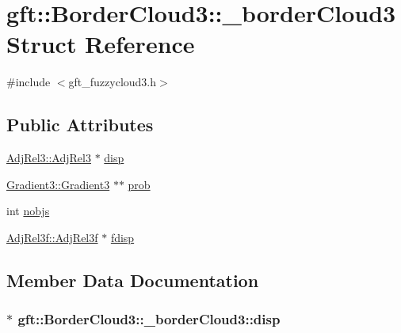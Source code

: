 \hypertarget{structgft_1_1BorderCloud3_1_1__borderCloud3}{}\section{gft\+:\+:Border\+Cloud3\+:\+:\+\_\+border\+Cloud3 Struct Reference}
\label{structgft_1_1BorderCloud3_1_1__borderCloud3}


{\ttfamily \#include $<$gft\+\_\+fuzzycloud3.\+h$>$}

\subsection*{Public Attributes}
\begin{DoxyCompactItemize}
\item 
\hyperlink{namespacegft_1_1AdjRel3_a0d54e2f148bf5636f3a3faf70d4eb5ae}{Adj\+Rel3\+::\+Adj\+Rel3} $\ast$ \hyperlink{structgft_1_1BorderCloud3_1_1__borderCloud3_a0fec3cf9d771fd02fcbb1687a51cc937}{disp}
\item 
\hyperlink{namespacegft_1_1Gradient3_acc3ba84d5f1e1fd680f64f29da6ac0eb}{Gradient3\+::\+Gradient3} $\ast$$\ast$ \hyperlink{structgft_1_1BorderCloud3_1_1__borderCloud3_a3828cfea35d3619a113a52594662993d}{prob}
\item 
int \hyperlink{structgft_1_1BorderCloud3_1_1__borderCloud3_a9837901f9e28f40dd2918d9687e53582}{nobjs}
\item 
\hyperlink{namespacegft_1_1AdjRel3f_a83ef20d6a560143af34ad546deafbe5f}{Adj\+Rel3f\+::\+Adj\+Rel3f} $\ast$ \hyperlink{structgft_1_1BorderCloud3_1_1__borderCloud3_aa24ef7cdb7021c700f0148d2d137a753}{fdisp}
\end{DoxyCompactItemize}


\subsection{Member Data Documentation}
\subsubsection[{\texorpdfstring{disp}{disp}}]{$\ast$ gft\+::\+Border\+Cloud3\+::\+\_\+border\+Cloud3\+::disp}\hypertarget{structgft_1_1BorderCloud3_1_1__borderCloud3_a0fec3cf9d771fd02fcbb1687a51cc937}{}\label{structgft_1_1BorderCloud3_1_1__borderCloud3_a0fec3cf9d771fd02fcbb1687a51cc937}
